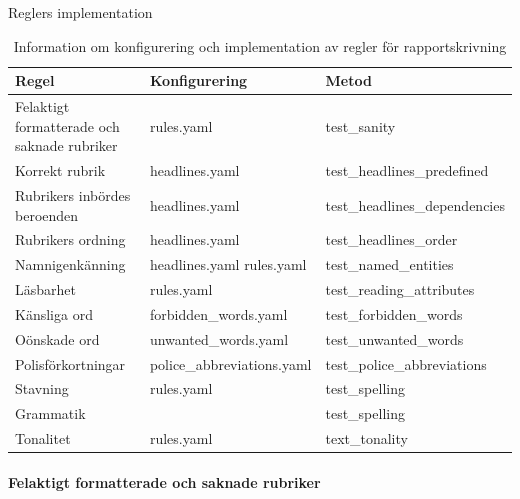 \documentclass[swedish]{maucsthesis}
\begin{document}
\begin{table}[H]
\centering
\caption{Reglers implementation}
\begin{tabular}{|l|l|l|}
\hline
Regel                                       & Konfigurering             & Metod                                 \\ \hline
Felaktigt formatterade och saknade rubriker & rules.yaml                & test\_sanity                          \\ \hline
Korrekt rubrik                              & headlines.yaml            & test\_headlines\_predefined           \\ \hline
Rubrikers inbördes beroenden                & headlines.yaml            & test\_headlines\_dependencies         \\ \hline
Rubrikers ordning                           & headlines.yaml            & test\_headlines\_order                \\ \hline
Namnigenkänning                             & headlines.yaml rules.yaml & test\_named\_entities                 \\ \hline
Läsbarhet                                   & rules.yaml                & test\_reading\_attributes             \\ \hline
Känsliga ord                                & forbidden\_words.yaml     & test\_forbidden\_words                \\ \hline
Oönskade ord                                & unwanted\_words.yaml      & test\_unwanted\_words                 \\ \hline
Polisförkortningar                          & police\_abbreviations.yaml    & test\_police\_abbreviations \\ \hline
Stavning                                    & rules.yaml                & test\_spelling                        \\ \hline
Grammatik                                   &                           & test\_spelling                        \\ \hline
Tonalitet                                   & rules.yaml                & text\_tonality                        \\ \hline
\end{tabular}
\caption*{Information om konfigurering och implementation av regler för rapportskrivning}
\label{implementationconfigurationtable}
\end{table}

\paragraph*{Felaktigt formatterade och saknade rubriker}
\end{document}
